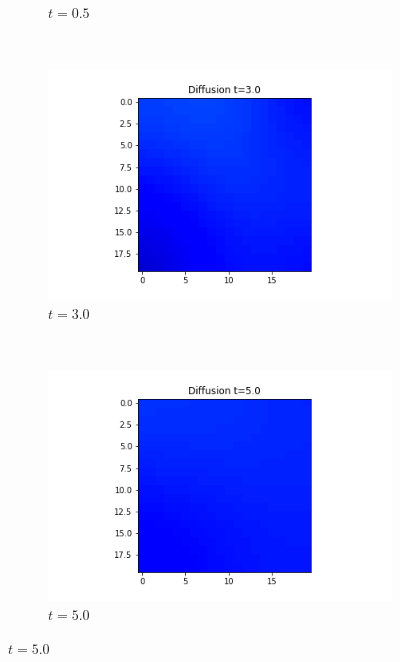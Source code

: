 \documentclass[10pt,a4paper]{article}
\begin{document}
\begin{enumerate}[i)]
\begin{enumerate}[a)]
\begin{figure}[!h]
\begin{subfigure}[b]{0.25\textwidth}
         				\caption{$t=0.5$}
         				\label{gridt05x01}
         			\end{subfigure}~
         			\begin{subfigure}[b]{0.25\textwidth}
         				\includegraphics[width= \textwidth]{images/grid-t3-x01.png}
         				\caption{$t=3.0$}
         				\label{gridt3x01}
         			\end{subfigure}~
         			\begin{subfigure}[b]{0.25\textwidth}
         				\includegraphics[width= \textwidth]{images/grid-t5-x01.png}
         				\caption{$t=5.0$}
         				\label{gridt5x01}
         			\end{subfigure}
         		   \label{gridx01}
         		\end{figure}
         		

\end{enumerate}
\end{enumerate}
\end{document}
